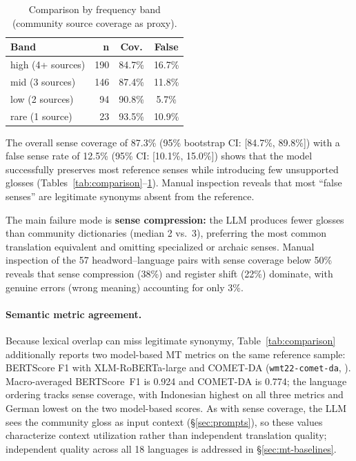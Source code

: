 \documentclass[11pt]{article}
\begin{document}
\begin{table}[t]
\centering
\small
\begin{tabular}{lrcc}
\toprule
\textbf{Band} & \textbf{n} & \textbf{Cov.} & \textbf{False} \\
\midrule
high (4+ sources) & 190 & 84.7\% & 16.7\% \\
mid (3 sources)   & 146 & 87.4\% & 11.8\% \\
low (2 sources)   &  94 & 90.8\% &  5.7\% \\
rare (1 source)   &  23 & 93.5\% & 10.9\% \\
\bottomrule
\end{tabular}
\caption{Comparison by frequency band (community source coverage as proxy).}
\label{tab:bands}
\end{table}

The overall sense coverage of 87.3\% (95\% bootstrap CI: [84.7\%, 89.8\%]) with a false sense rate of 12.5\% (95\% CI: [10.1\%, 15.0\%]) shows that the model successfully preserves most reference senses while introducing few unsupported glosses (Tables~\ref{tab:comparison}--\ref{tab:bands}). Manual inspection reveals that most ``false senses'' are legitimate synonyms absent from the reference.

The main failure mode is \textbf{sense compression:} the LLM produces fewer glosses than community dictionaries (median 2 vs.\ 3), preferring the most common translation equivalent and omitting specialized or archaic senses. Manual inspection of the 57 headword--language pairs with sense coverage below 50\% reveals that sense compression (38\%) and register shift (22\%) dominate, with genuine errors (wrong meaning) accounting for only 3\%.

\paragraph{Semantic metric agreement.} Because lexical overlap can miss legitimate synonymy, Table~\ref{tab:comparison} additionally reports two model-based MT metrics on the same reference sample: BERTScore F1 with XLM-RoBERTa-large \citep{zhang2020bertscore} and COMET-DA (\texttt{wmt22-comet-da}, \citealp{rei2022comet}). Macro-averaged BERTScore~F1 is 0.924 and COMET-DA is 0.774; the language ordering tracks sense coverage, with Indonesian highest on all three metrics and German lowest on the two model-based scores. As with sense coverage, the LLM sees the community gloss as input context (\S\ref{sec:prompts}), so these values characterize context utilization rather than independent translation quality; independent quality across all 18 languages is addressed in \S\ref{sec:mt-baselines}.
\end{document}
